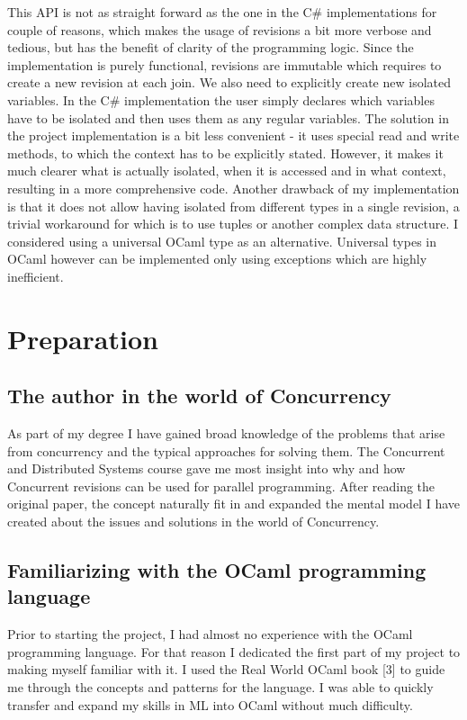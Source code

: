 \documentclass[12pt,twoside,notitlepage]{report}
\begin{document}
This API is not as straight forward as the one in the C\# implementations for couple of reasons, which makes the usage of revisions a bit more verbose and tedious, but has the benefit of clarity of the programming logic. Since the implementation is purely functional, revisions are immutable which requires to create a new revision at each join. We also need to explicitly create new isolated variables. In the C\# implementation the user simply declares which variables have to be isolated and then uses them as any regular variables. The solution in the project implementation is a bit less convenient - it uses special read and write methods, to which the context has to be explicitly stated. However, it makes it much clearer what is actually isolated, when it is accessed and in what context, resulting in a more comprehensive code.  Another drawback of my implementation is that it does not allow having isolated from different types in a single revision, a trivial workaround for which is to use tuples or another complex data structure. I considered using a universal OCaml type as an alternative. Universal types in OCaml however can be implemented only using exceptions which are highly inefficient. 




\cleardoublepage



\chapter{Preparation}
\section{The author in the world of Concurrency}
As part of my degree I have gained broad knowledge of the problems that arise from concurrency and the typical approaches for solving them. The Concurrent and Distributed Systems course gave me most insight into why and how Concurrent revisions can be used for parallel programming. After reading the original paper, the concept naturally fit in and expanded the mental model I have created about the issues and solutions in the world of Concurrency.  

\section{Familiarizing with the OCaml programming language}
Prior to starting the project, I had almost no experience with the OCaml programming language. For that reason I dedicated the first part of my project to making myself familiar with it. I used the Real World OCaml book [3] to guide me through the concepts and patterns for the language. I was able to quickly transfer and expand my skills in ML into OCaml without much difficulty.
\end{document}

